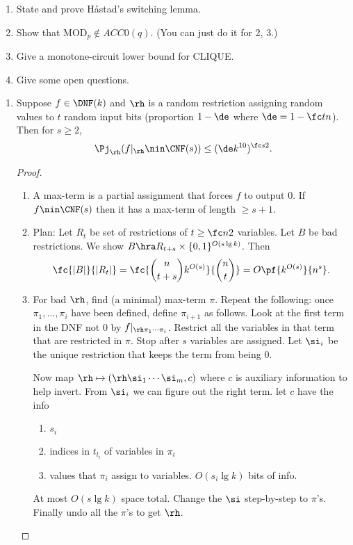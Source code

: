 \begin{enumerate}
\item
State and prove H\r{a}stad's switching lemma.
\item Show that MOD${}_p\nin ACC0(q)$. (You can just do it for 2, 3.)
\item Give a monotone-circuit lower bound for CLIQUE.
\item Give some open questions.
\end{enumerate}
\begin{enumerate}
\item
\begin{lem}
Suppose $f\in \DNF(k)$ and $\rh$ is a random restriction assigning random values to $t$ random input bits (proportion $1-\de$ where $\de=1-\fc tn$). Then for $s\ge 2$,
\[
\Pj_\rh(f|_{\rh}\nin \CNF(s))\le (\de k^{10})^{\fc s2}.
\]
\end{lem}
\begin{proof}
\begin{enumerate}
\item
A max-term is a partial assignment that forces $f$ to output 0. If $f\nin\CNF(s)$ then it has a max-term of length $\ge s+1$.
\item 
Plan: Let $R_t$ be set of restrictions of $t\ge \fc n2$ variables. Let $B$ be bad restrictions. We show $B\hra R_{t+s}\times \{0,1\}^{O(s\lg k)}$. Then
\[
\fc{|B|}{|R_t|}=\fc{\binom{n}{t+s}k^{O(s)}}{\binom nt}=O\pf{k^{O(s)}}{n^s}.
\]
\item
For bad $\rh$, find (a minimal) max-term $\pi$. 
Repeat the following: once $\pi_1,\ldots, \pi_i$ have been defined, define $\pi_{i+1}$ as follows. Look at the first term in the DNF not 0 by $f|_{\rh\pi_1\cdots \pi_i}$. Restrict all the variables in that term that are restricted in $\pi$. Stop after $s$ variables are assigned. Let $\si_i$ be the unique restriction that keeps the term from being 0.  

Now map $\rh\mapsto (\rh\si_1\cdots \si_m,c)$ where $c$ is auxiliary information to help invert. From $\si_i$ we can figure out the right term. let $c$ have the info
\begin{enumerate}
\item
$s_i$
\item
indices in $t_{l_i}$ of variables in $\pi_i$
\item
values that $\pi_i$ assign to variables. $O(s_i\lg k)$ bits of info.
\end{enumerate}
At most $O(s\lg k)$ space total. Change the $\si$ step-by-step to $\pi$'s. Finally undo all the $\pi$'s to get $\rh$.


\end{enumerate}
\end{proof}
\end{enumerate}
